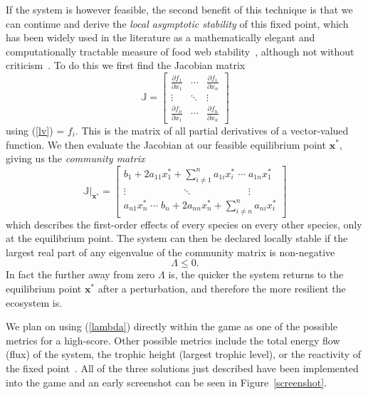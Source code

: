 If the system is however feasible, the second benefit of this technique is that we can continue and derive the \emph{local asymptotic stability} of this fixed point, which has been widely used in the literature as a mathematically elegant and computationally tractable measure of food web stability~\cite{may, emmerson}, although not without criticism~\cite{reactivity, axelrossberg}. To do this we first find the Jacobian matrix
\begin{equation}
    \mathbb{J} = \begin{bmatrix}
    \frac{\partial f_1}{\partial x_1} & 
    \cdots &
    \frac{\partial f_1}{\partial x_n} \\
    \vdots &
    \ddots &
    \vdots \\
    \frac{\partial f_n}{\partial x_1} & 
    \cdots &
    \frac{\partial f_n}{\partial x_n}
    \end{bmatrix}
\end{equation}
using (\ref{lv}) = $f_i$.
This is the matrix of all partial derivatives of a vector-valued function. We then evaluate the Jacobian at our feasible equilibrium point $\mathbf{x}^*$, giving us the \emph{community matrix}
\begin{equation}
    \mathbb{J}|_\mathbf{x^*} = \begin{bmatrix}
    b_1 + 2a_{11}x_1^* + \sum_{i\neq 1}^na_{1i}x_i^*
    \;\cdots\;
    a_{1n}x_1^*\\
    \vdots 
    \qquad\qquad\quad\;\;\ddots\qquad\qquad\quad\;\;
    \vdots \\
    a_{n1}x_n^*
    \;\cdots\;
    b_n + 2a_{nn}x_n^* + \sum_{i\neq n}^na_{ni}x_i^* 
    \end{bmatrix}
\end{equation}
which describes the first-order effects of every species on every other species, only at the equilibrium point.
The system can then be declared locally stable if the largest real part of any eigenvalue of the community matrix is non-negative
\begin{equation}
    \Lambda \leq 0.
    \label{lambda}
\end{equation}
In fact the further away from zero $\Lambda$ is, the quicker the system returns to the equilibrium point $\mathbf{x}^*$ after a perturbation, and therefore the more resilient the ecosystem is.

We plan on using (\ref{lambda}) directly within the game as one of the possible metrics for a high-score.
Other possible metrics include the total energy flow (flux) of the system, the trophic height (largest trophic level), or the reactivity of the fixed point~\cite{reactivity}.
All of the three solutions just described have been implemented into the game and an early screenshot can be seen in Figure~\ref{screenshot}.

